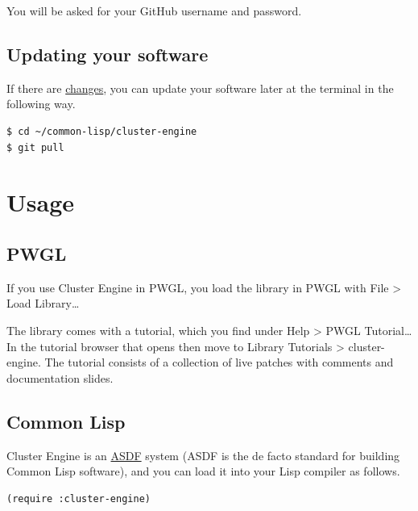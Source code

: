 You will be asked for your GitHub username and password.


\subsection*{Updating your software}
\label{sec:org5a0a278}

If there are \href{https://github.com/tanders/cluster-engine/commits/master}{changes}, you can update your software later at the terminal in the following way.

\lstset{language=bash,label= ,caption= ,captionpos=b,numbers=none}
\begin{lstlisting}
$ cd ~/common-lisp/cluster-engine
$ git pull
\end{lstlisting}




\section*{Usage}
\label{sec:org8917ff4}

\subsection*{PWGL}
\label{sec:orgaf579e5}

If you use Cluster Engine in PWGL, you load the library in PWGL with File > Load Library\ldots{}

The library comes with a tutorial, which you find under Help > PWGL Tutorial\ldots{} In the tutorial browser that opens then move to Library Tutorials > cluster-engine. The tutorial consists of a collection of live patches with comments and documentation slides. 


\subsection*{Common Lisp}
\label{sec:org422cfba}

Cluster Engine is an \href{https://common-lisp.net/project/asdf/}{ASDF} system (ASDF is the de facto standard for building Common Lisp software), and you can load it into your Lisp compiler as follows.

\lstset{language=Lisp,label= ,caption= ,captionpos=b,numbers=none}
\begin{lstlisting}
(require :cluster-engine)
\end{lstlisting}

